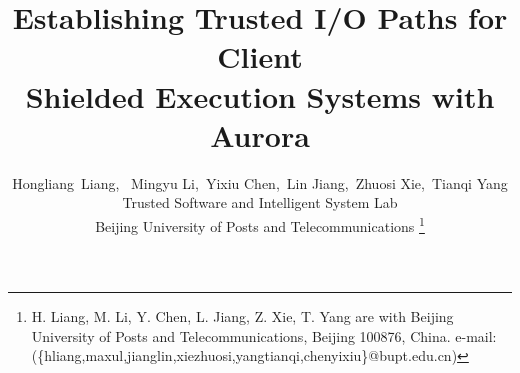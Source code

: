 \documentclass[journal,twocolumn,letterpaper,10pt]{ieee-sty/IEEEtran}
\begin{document}


\title{ Establishing Trusted I/O Paths for Client \\ Shielded Execution Systems with Aurora }

\author{Hongliang~Liang,~
	Mingyu Li,~Yixiu Chen,~Lin Jiang,~Zhuosi Xie,~Tianqi Yang\\
	Trusted Software and Intelligent System Lab\\
	Beijing University of Posts and Telecommunications
	\thanks{H. Liang, M. Li, Y. Chen, L. Jiang, Z. Xie, T. Yang
  are with Beijing University of Posts and Telecommunications, Beijing 100876, China. e-mail: (\{hliang,maxul,jianglin,xiezhuosi,yangtianqi,chenyixiu\}@bupt.edu.cn)
  }%
}

\maketitle









\end{document}
